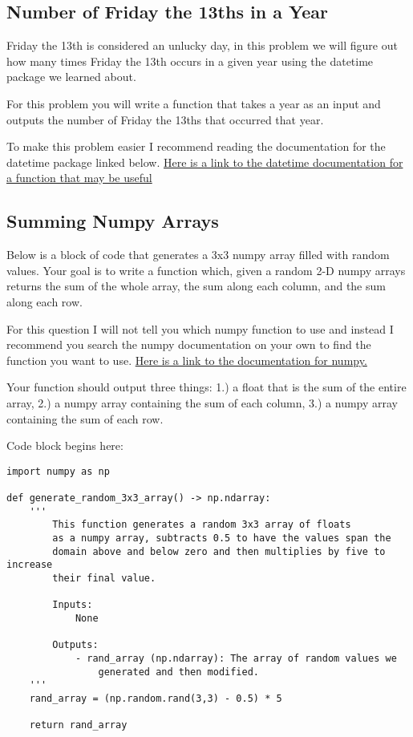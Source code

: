 \documentclass[12pt]{article}
\begin{document}
\subsection{Number of Friday the 13ths in a Year}

Friday the 13th is considered an unlucky day, in this problem we will figure out how many times Friday the 13th occurs in a given year using the datetime package we learned about. 

For this problem you will write a function that takes a year as an input and outputs the number of Friday the 13ths that occurred that year.

To make this problem easier I recommend reading the documentation for the datetime package linked below. \href{https://docs.python.org/3/library/datetime.html#datetime.date.weekday}{Here is a link to the datetime documentation for a function that may be useful}

\subsection{Summing Numpy Arrays}

Below is a block of code that generates a 3x3 numpy array filled with random values. Your goal is to write a function which, given a random 2-D numpy arrays returns the sum of the whole array, the sum along each column, and the sum along each row. 

For this question I will not tell you which numpy function to use and instead I recommend you search the numpy documentation on your own to find the function you want to use. \href{https://numpy.org/doc/2.0/reference/index.html#reference}{Here is a link to the documentation for numpy.}

Your function should output three things: 1.) a float that is the sum of the entire array, 2.) a numpy array containing the sum of each column, 3.) a numpy array containing the sum of each row.

Code block begins here:

\begin{lstlisting}
import numpy as np

def generate_random_3x3_array() -> np.ndarray:
    '''
        This function generates a random 3x3 array of floats
        as a numpy array, subtracts 0.5 to have the values span the
        domain above and below zero and then multiplies by five to increase
        their final value.

        Inputs:
            None

        Outputs:
            - rand_array (np.ndarray): The array of random values we
                generated and then modified.
    '''
    rand_array = (np.random.rand(3,3) - 0.5) * 5

    return rand_array
\end{lstlisting}
\end{document}
